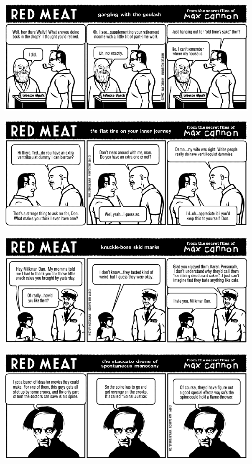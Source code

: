 \documentclass[a4paper,twoside,11pt]{article}
\begin{document}
\includegraphics[width=\textwidth]{redmeat_1997-09-29.png}



\includegraphics[width=\textwidth]{redmeat_1997-10-06.png}



\includegraphics[width=\textwidth]{redmeat_1997-10-13.png}



\includegraphics[width=\textwidth]{redmeat_1997-10-20.png}
\end{document}
